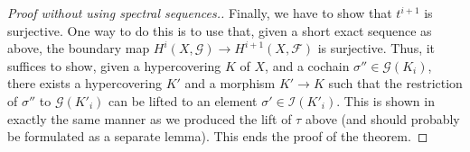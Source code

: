 \begin{proof}[Proof without using spectral sequences.]
\medskip\noindent
Finally, we have to show that $t^{i + 1}$ is surjective.
One way to do this is to use that, given a short exact
sequence as above, the boundary map
$H^i(X, \mathcal{G}) \to H^{i + 1}(X, \mathcal{F})$
is surjective. Thus, it suffices to show, given a
hypercovering $K$ of $X$, and a cochain
$\sigma'' \in \mathcal{G}(K_i)$, there exists a hypercovering
$K'$ and a morphism $K' \to K$ such that the restriction
of $\sigma''$ to $\mathcal{G}(K'_i)$ can be lifted
to an element $\sigma' \in \mathcal{I}(K'_i)$.
This is shown in exactly the same manner as we produced
the lift of $\tau$ above (and should probably be formulated
as a separate lemma). This ends the proof of the theorem.
\end{proof}










